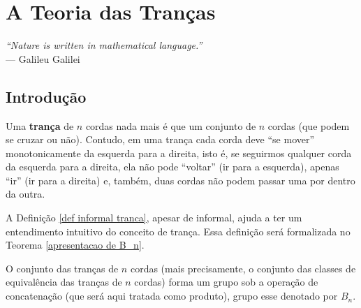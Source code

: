 \chapter[A Teoria das Tranças]{A Teoria das Tranças}
\label{cap-3}
\chaptermark{}
%
\hfill%
\begin{minipage}{10cm}
\begin{flushright}
\rightskip=0.5cm
\textit{``Nature is written in mathematical language.''}
\\[0.1cm]
\rightskip=0.5cm
--- Galileu Galilei
\end{flushright}
\end{minipage}

\section{Introdução}
    \begin{definition}
    \label{def informal tranca}
    	Uma \textbf{trança} de $n$ cordas nada mais é que um conjunto de $n$ cordas (que podem se cruzar ou não).
    	Contudo, em uma trança cada corda deve ``se mover'' monotonicamente da esquerda para a direita, isto é, 
    	se seguirmos qualquer corda da esquerda para a direita, ela não pode ``voltar'' (ir para a esquerda),
    	apenas ``ir'' (ir para a direita) e, também, duas cordas não podem passar uma por dentro da outra.
    \end{definition}
    \par\vspace{0.3cm} A Definição \ref{def informal tranca}, apesar de informal, ajuda a ter um entendimento
    intuitivo do conceito de trança. Essa definição será formalizada no Teorema \ref{apresentacao de B_n}.
    	
	\par\vspace{0.3cm} O conjunto das tranças de $n$ cordas (mais precisamente, o conjunto das classes 
	de equivalência das tranças de $n$ cordas) forma um grupo sob a operação de concatenação 
	(que será aqui tratada como produto), grupo esse denotado por $B_n$. 
	
